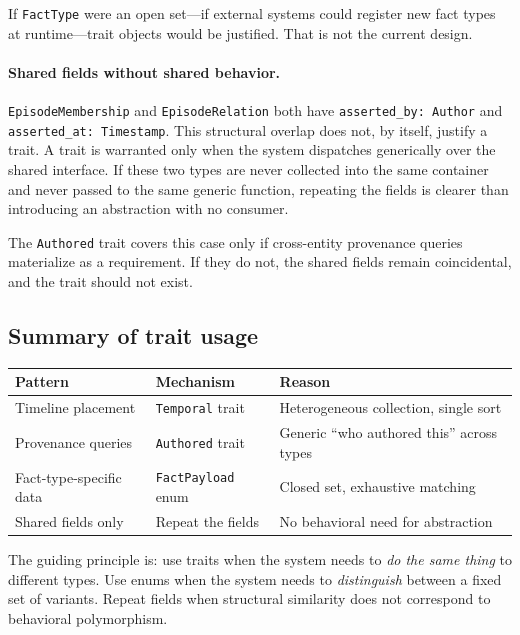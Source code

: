 \documentclass[11pt]{article}
\begin{document}
If \texttt{FactType} were an open set---if external systems could register
new fact types at runtime---trait objects would be justified. That is not the
current design.

\paragraph{Shared fields without shared behavior.}
\texttt{EpisodeMembership} and \texttt{EpisodeRelation} both have
\texttt{asserted\_by: Author} and \texttt{asserted\_at: Timestamp}. This
structural overlap does not, by itself, justify a trait. A trait is warranted
only when the system dispatches generically over the shared interface. If
these two types are never collected into the same container and never passed
to the same generic function, repeating the fields is clearer than
introducing an abstraction with no consumer.

The \texttt{Authored} trait covers this case only if cross-entity provenance
queries materialize as a requirement. If they do not, the shared fields
remain coincidental, and the trait should not exist.

\subsection{Summary of trait usage}

\begin{center}
\renewcommand{\arraystretch}{1.3}
\begin{tabular}{l l l}
\textbf{Pattern} & \textbf{Mechanism} & \textbf{Reason} \\
\hline
Timeline placement & \texttt{Temporal} trait &
  Heterogeneous collection, single sort \\
Provenance queries & \texttt{Authored} trait &
  Generic ``who authored this'' across types \\
Fact-type-specific data & \texttt{FactPayload} enum &
  Closed set, exhaustive matching \\
Shared fields only & Repeat the fields &
  No behavioral need for abstraction \\
\end{tabular}
\end{center}

The guiding principle is: use traits when the system needs to \emph{do the
same thing} to different types. Use enums when the system needs to
\emph{distinguish} between a fixed set of variants. Repeat fields when
structural similarity does not correspond to behavioral polymorphism.
\end{document}
